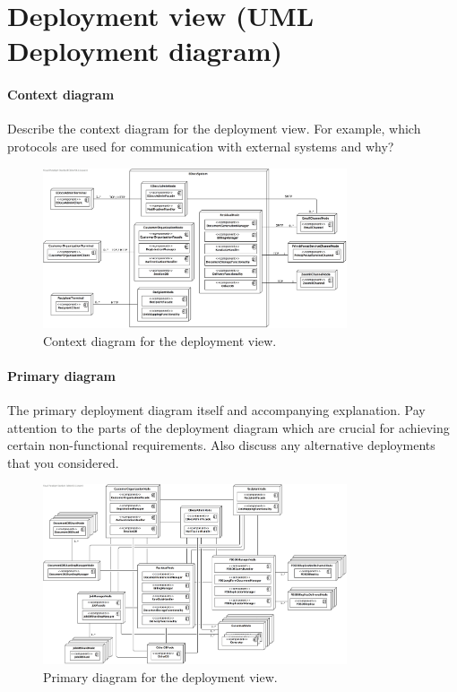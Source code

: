 \documentclass[a4paper,10pt]{article}
\begin{document}
\section{Deployment view (UML Deployment diagram)}\label{sec:deployment}
\paragraph{Context diagram}
Describe the context diagram for the deployment view.
For example, which protocols are used for communication with external systems
and why?

\begin{figure}[!htp]
	\centering
	\includegraphics[width=0.8\textwidth]{ContextDeployment.png}
    \caption{Context diagram for the deployment view.}
    \label{fig:depl_context}
\end{figure}
\FloatBarrier

\paragraph{Primary diagram}
The primary deployment diagram itself and accompanying explanation.
Pay attention to the parts of the deployment diagram which are crucial for
achieving certain non-functional requirements.
Also discuss any alternative deployments that you considered.

\begin{figure}[!htp]
    \centering
	\includegraphics[width=0.8\textwidth]{TotalDeployment.png}
    \caption{Primary diagram for the deployment view.}
    \label{fig:depl_primary}
\end{figure}
\FloatBarrier
\end{document}
